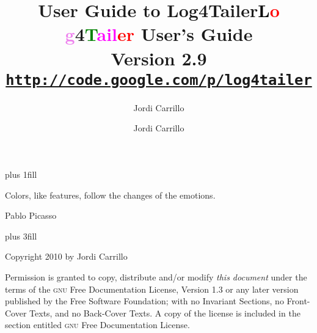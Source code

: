 \documentclass[a4paper]{article}
\author{Jordi Carrillo}
\title{User Guide to Log4Tailer}
\newcommand{\logftailer}{\textbf{\textcolor{black}{L}\textcolor{red}{o}%
\textcolor{Violet}{g}4\textcolor{green}{T}\textcolor{magenta}{ail}\textcolor{red}{er}}}
\newcommand{\contentsrule}[1]{{\color{blue}\sectionrule{3ex}{3pt}{-2ex}{1pt}{#1}}}
\begin{document}


\newpage
\pagecolor{white}

\vbox{}
\vskip0pt plus 1fill
\epigraph{Colors, like features, follow the changes of the emotions.}{Pablo Picasso}
 \vskip0pt plus 3fill

\noindent
Copyright 2010 by Jordi Carrillo

\medskip
\noindent 
Permission is granted to copy, distribute and/or modify \emph{this document}
under the terms of the \textsc{gnu} Free Documentation License, Version 1.3
or any later version published by the Free Software Foundation;
with no Invariant Sections, no Front-Cover Texts, and no Back-Cover Texts.
A copy of the license is included in the section entitled \textsc{gnu}
Free Documentation License.


\vbox{}
\newpage


\title{{\bfseries \logftailer{} User's Guide}\\[1mm]
  \large Version 2.9\\[1mm]
\large\href{http://code.google.com/p/log4tailer}{\texttt{http://code.google.com/p/log4tailer}}}
\author{Jordi Carrillo}

\maketitle

\tableofcontents

\newpage




%

\end{document}
